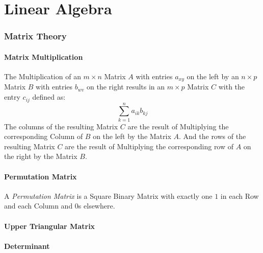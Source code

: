 \part{Linear Algebra}\label{sec:linear_algebra}

\section{Matrix Theory}\label{sec:matrix_theory}

\subsection{Matrix Multiplication}\label{sec:matrix_multiplication}

The Multiplication of an $m \times n$ Matrix $A$ with entries $a_{xy}$
on the left by an $n \times p$ Matrix $B$ with entries $b_{wv}$ on the
right results in an $m \times p$ Matrix $C$ with the entry $c_{ij}$
defined as:
\[
  \sum_{k=1}^n a_{ik} b_{kj}
\]
The columns of the resulting Matrix $C$ are the result of Multiplying
the corresponding Column of $B$ on the left by the Matrix $A$. And the
rows of the resulting Matrix $C$ are the result of Multiplying the
corresponding row of $A$ on the right by the Matrix $B$.



\subsection{Permutation Matrix}\label{sec:permutation_matrix}

A \emph{Permutation Matrix} is a Square Binary Matrix with exactly one
$1$ in each Row and each Column and $0$s elsewhere.



\subsection{Upper Triangular Matrix}\label{sec:upper_triangular}



\subsection{Determinant}\label{sec:determinant}
